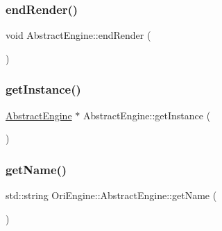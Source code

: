 \hypertarget{class_ori_engine_1_1_abstract_engine_a6a9cec01e078695703f9def8e3814dbf}{}\label{class_ori_engine_1_1_abstract_engine_a6a9cec01e078695703f9def8e3814dbf} 
\subsubsection{\texorpdfstring{end\+Render()}{endRender()}}
{\footnotesize\ttfamily void Abstract\+Engine\+::end\+Render (\begin{DoxyParamCaption}{ }\end{DoxyParamCaption})}

\hypertarget{class_ori_engine_1_1_abstract_engine_a650375136fb726707d36acbf9f7ed3b8}{}\label{class_ori_engine_1_1_abstract_engine_a650375136fb726707d36acbf9f7ed3b8} 
\subsubsection{\texorpdfstring{get\+Instance()}{getInstance()}}
{\footnotesize\ttfamily \hyperlink{class_ori_engine_1_1_abstract_engine}{Abstract\+Engine} $\ast$ Abstract\+Engine\+::get\+Instance (\begin{DoxyParamCaption}{ }\end{DoxyParamCaption})\hspace{0.3cm}{\ttfamily [static]}}

\hypertarget{class_ori_engine_1_1_abstract_engine_a41b34e146f5b19e40dc3f1cb1343d4d6}{}\label{class_ori_engine_1_1_abstract_engine_a41b34e146f5b19e40dc3f1cb1343d4d6} 
\subsubsection{\texorpdfstring{get\+Name()}{getName()}}
{\footnotesize\ttfamily std\+::string Ori\+Engine\+::\+Abstract\+Engine\+::get\+Name (\begin{DoxyParamCaption}{ }\end{DoxyParamCaption})\hspace{0.3cm}{\ttfamily [inline]}}

